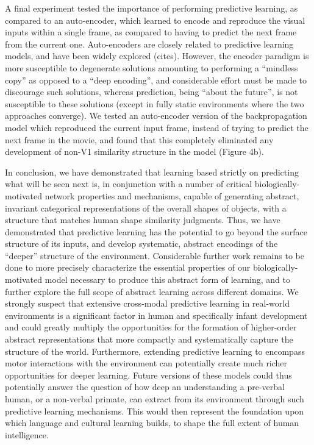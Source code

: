 \documentclass[11pt,twoside]{article}
\newif\myifpdf
\begin{document}
A final experiment tested the importance of performing predictive learning, as compared to an auto-encoder, which learned to encode and reproduce the visual inputs within a single frame, as compared to having to predict the next frame from the current one.  Auto-encoders are closely related to predictive learning models, and have been widely explored (cites).  However, the encoder paradigm is more susceptible to degenerate solutions amounting to performing a “mindless copy” as opposed to a “deep encoding”, and considerable effort must be made to discourage such solutions, whereas prediction, being “about the future”, is not susceptible to these solutions (except in fully static environments where the two approaches converge).  We tested an auto-encoder version of the backpropagation model which reproduced the current input frame, instead of trying to predict the next frame in the movie, and found that this completely eliminated any development of non-V1 similarity structure in the model (Figure 4b).

In conclusion, we have demonstrated that learning based strictly on predicting what will be seen next is, in conjunction with a number of critical biologically-motivated network properties and mechanisms, capable of generating abstract, invariant categorical representations of the overall shapes of objects, with a structure that matches human shape similarity judgments.  Thus, we have demonstrated that predictive learning has the potential to go beyond the surface structure of its inputs, and develop systematic, abstract encodings of the “deeper” structure of the environment.  Considerable further work remains to be done to more precisely characterize the essential properties of our biologically-motivated model necessary to produce this abstract form of learning, and to further explore the full scope of abstract learning across different domains.  We strongly suspect that extensive cross-modal predictive learning in real-world environments is a significant factor in human and specifically infant development and could greatly multiply the opportunities for the formation of higher-order abstract representations that more compactly and systematically capture the structure of the world.  Furthermore, extending predictive learning to encompass motor interactions with the environment can potentially create much richer opportunities for deeper learning.  Future versions of these models could thus potentially answer the question of how deep an understanding a pre-verbal human, or a non-verbal primate, can extract from its environment through such predictive learning mechanisms.  This would then represent the foundation upon which language and cultural learning builds, to shape the full extent of human intelligence.


\end{document}
